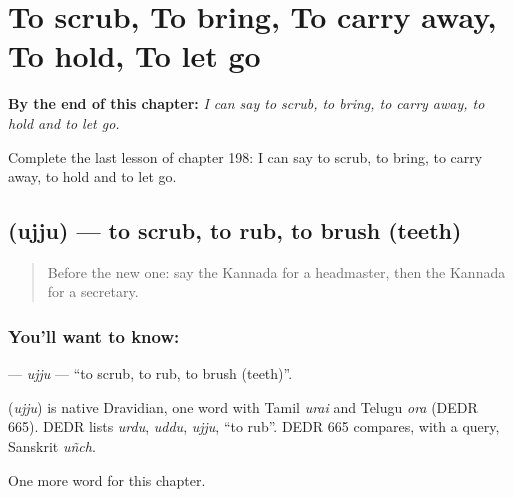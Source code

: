 
\chapter{To scrub, To bring, To carry away, To hold, To let go}
\label{ch:ka-to-scrub-to-bring-to-carry-away-to-hold-to-let-go}

\begin{chapteropening}
\textbf{By the end of this chapter:} \emph{I can say to scrub, to bring, to carry away, to hold and to let go.}

Complete the last lesson of chapter 198: I can say to scrub, to bring, to carry away, to hold and to let go.
\end{chapteropening}

\section[\texorpdfstring{\kn{ಉಜ್ಜು} (ujju)}{ಉಜ್ಜು (ujju)}]{ (ujju) — to scrub, to rub, to brush (teeth)}

\label{lesson:KA-C198-ujju}



\begin{quote}
Before the new one: say the Kannada for a headmaster, then the Kannada for a secretary.
\end{quote}

\subsection*{You'll want to know: }
\textbf{} — \emph{ujju} — \textquotedblleft{}to scrub, to rub, to brush (teeth)\textquotedblright{}.

\begin{cousinweb}
\textbf{} (\emph{ujju}) is native Dravidian, one word with Tamil \emph{urai} and Telugu \emph{ora} (DEDR 665). DEDR lists \emph{urdu}, \emph{uddu}, \emph{ujju}, \textquotedblleft{}to rub\textquotedblright{}. DEDR 665 compares, with a query, Sanskrit \emph{uñch}.
\end{cousinweb}

\begin{grammarlens}[title={What you've built}]
One more word for this chapter.
\end{grammarlens}

